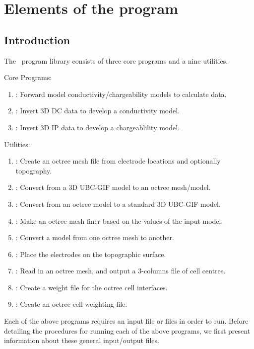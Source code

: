 \section{Elements of the program \programName}
\label{Elements}

\subsection{Introduction}

The \codeName{\prog} ~program library consists of three core programs and a nine utilities.

Core Programs:
\begin{enumerate}
\item {}: Forward model conductivity/chargeability models to calculate data.
\item {}: Invert 3D DC data to develop a conductivity model.
\item {}: Invert 3D IP data to develop a chargeablility model.
\end{enumerate}

Utilities:
\begin{enumerate}
\item {}: Create an octree mesh file from electrode locations and optionally
topography.
\item {}: Convert from a 3D UBC-GIF model to an octree mesh/model.
\item {}: Convert from an octree model to a standard 3D UBC-GIF model.
\item {}: Make an octree mesh finer based on the values of the input model.
\item {}: Convert a model from one octree mesh to another.
\item {}: Place the electrodes on the topographic surface.
\item {}: Read in an octree mesh, and output a 3-columns file of cell centres.
\item {}: Create a weight file for the octree cell interfaces.
\item {}: Create an octree cell weighting file.
\end{enumerate}

Each of the above programs requires an input file or files in order to run. Before detailing the procedures for running each of the above programs, we first present information about these general input/output files.

